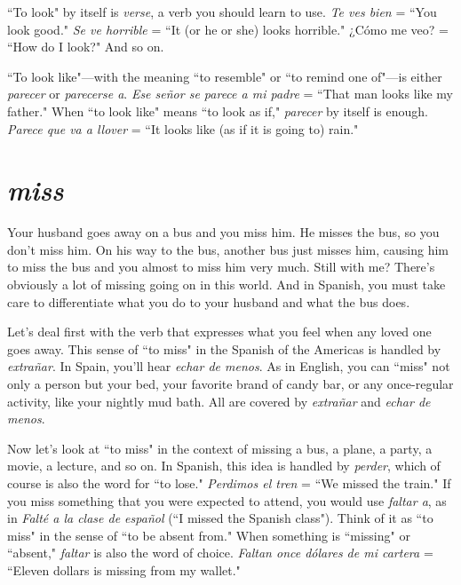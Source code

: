 ``To look" by itself is \emph{verse}, a verb you should learn to use. \emph{Te
ves bien} = ``You look good." \emph{Se ve horrible} = ``It (or he or she) looks
horrible." ¿Cómo me veo? = ``How do I look?" And so on.

``To look like"---with the meaning ``to resemble" or ``to remind one of"---is either \emph{parecer} or \emph{parecerse a}. \emph{Ese señor se parece a
mi padre} = ``That man looks like my father." When ``to look like"
means ``to look as if," \emph{parecer} by itself is enough. \emph{Parece que va a
llover} = ``It looks like (as if it is going to) rain."

\section{\emph{miss}}

Your husband goes away on a bus and you miss him. He
misses the bus, so you don't miss him. On his way to the bus, another
bus just misses him, causing him to miss the bus and you almost to
miss him very much. Still with me? There's obviously a lot of missing
going on in this world. And in Spanish, you must take care to differentiate what you do to your husband and what the bus does.

Let's deal first with the verb that expresses what you feel
when any loved one goes away. This sense of ``to miss" in the Spanish
of the Americas is handled by \emph{extrañar}. In Spain, you'll hear \emph{echar de
menos}. As in English, you can ``miss" not only a person but your bed,
your favorite brand of candy bar, or any once-regular activity, like your
nightly mud bath. All are covered by \emph{extrañar} and \emph{echar de menos}.

Now let's look at ``to miss" in the context of missing a bus,
a plane, a party, a movie, a lecture, and so on. In Spanish, this idea is
handled by \emph{perder}, which of course is also the word for ``to lose." \emph{Perdimos el tren} = ``We missed the train." If you miss something that
you were expected to attend, you would use \emph{faltar a}, as in \emph{Falté a la
clase de español} (``I missed the Spanish class"). Think of it as ``to
miss" in the sense of ``to be absent from." When something is ``missing" or ``absent," \emph{faltar} is also the word of choice. \emph{Faltan once dólares
de mi cartera} = ``Eleven dollars is missing from my wallet."

